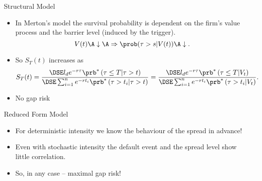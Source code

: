 {Structural Model}

\begin{itemize}
\item<1-> In Merton's model the survival probability is dependent on the firm's value process and the barrier level (induced by the trigger).
$$
V(t) \A \downarrow \A \Rightarrow \prob(\tau > s |V(t)) \A \downarrow.
$$
\item<2-> So $S_T(t)$ increases as
$$
S_T(t)=\frac{\DSE l_d e^{-r\tau} \prb^*\left(\tau\leq T  | \tau >t\right)} {\DSE\sum_{i=1}^n e^{-rt_i} \prb^*\left(\tau >t_i| \tau >t\right)}
=\frac{\DSE l_d e^{-r\tau} \prb^*\left(\tau\leq T  | V_t \right)} {\DSE\sum_{i=1}^n e^{-rt_i} \prb^*\left(\tau >t_i| V_t\right)}.
$$
\item<3-> No gap risk
\end{itemize}

{Reduced Form Model}

\begin{itemize}
\item<1->
For deterministic intensity we know the behaviour of the spread  in advance!
\item<2->
Even with stochastic intensity the default event and the spread level show little correlation.
\item<3->  So, in any case  -- maximal gap risk!
\end{itemize}

